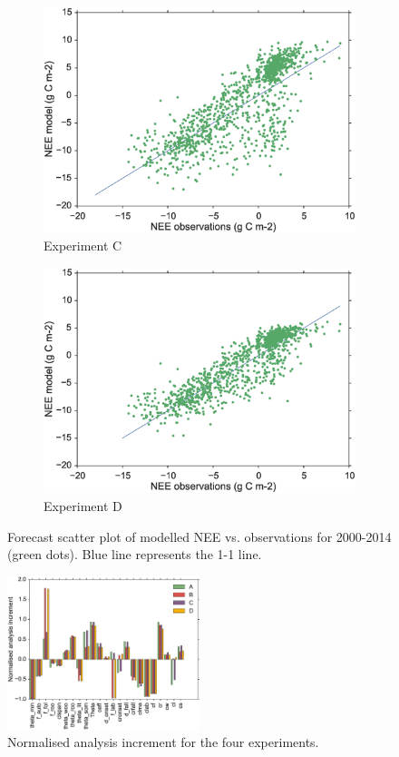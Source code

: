 \documentclass[11pt]{article}
\begin{document}
\begin{figure}
\begin{subfigure}[b]{0.49\textwidth}
        \includegraphics[width=\textwidth]{Cfscat.eps}
        \caption{Experiment C}
        \label{fig:forecastscatBcorR}
    \end{subfigure}
    \begin{subfigure}[b]{0.49\textwidth}
        \includegraphics[width=\textwidth]{Dfscat.eps}
        \caption{Experiment D}
        \label{fig:forecastscatedcBcorR}
    \end{subfigure}
    \caption{Forecast scatter plot of modelled NEE vs. observations for 2000-2014 (green dots). Blue line represents the 1-1 line.}\label{fig:animals}
\end{figure}

\begin{figure}[ht]
    \centering
    \includegraphics[width=0.5\textwidth]{inccvt.eps}
    \caption{Normalised analysis increment for the four experiments.}
    \label{fig:xa_inc}
\end{figure}
\end{document}
